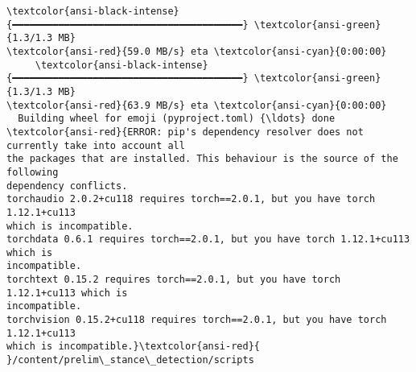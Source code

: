 \documentclass[11pt]{article}
\begin{document}
\begin{Verbatim}[commandchars=\\\{\}]
     \textcolor{ansi-black-intense}{━━━━━━━━━━━━━━━━━━━━━━━━━━━━━━━━━━━━━━━━} \textcolor{ansi-green}{1.3/1.3 MB}
\textcolor{ansi-red}{59.0 MB/s} eta \textcolor{ansi-cyan}{0:00:00}
     \textcolor{ansi-black-intense}{━━━━━━━━━━━━━━━━━━━━━━━━━━━━━━━━━━━━━━━━} \textcolor{ansi-green}{1.3/1.3 MB}
\textcolor{ansi-red}{63.9 MB/s} eta \textcolor{ansi-cyan}{0:00:00}
  Building wheel for emoji (pyproject.toml) {\ldots} done
\textcolor{ansi-red}{ERROR: pip's dependency resolver does not currently take into account all
the packages that are installed. This behaviour is the source of the following
dependency conflicts.
torchaudio 2.0.2+cu118 requires torch==2.0.1, but you have torch 1.12.1+cu113
which is incompatible.
torchdata 0.6.1 requires torch==2.0.1, but you have torch 1.12.1+cu113 which is
incompatible.
torchtext 0.15.2 requires torch==2.0.1, but you have torch 1.12.1+cu113 which is
incompatible.
torchvision 0.15.2+cu118 requires torch==2.0.1, but you have torch 1.12.1+cu113
which is incompatible.}\textcolor{ansi-red}{
}/content/prelim\_stance\_detection/scripts
    \end{Verbatim}
\end{document}
